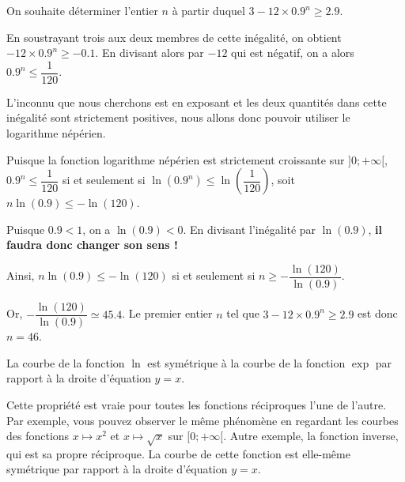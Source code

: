 \documentclass[11pt,fleqn, openany]{book} %
\begin{document}
\begin{example}On souhaite déterminer l'entier $n$ à partir duquel $3-12 \times 0.9^n \geqslant 2.9$.

En soustrayant trois aux deux membres de cette inégalité, on obtient $-12 \times 0.9^n \geqslant -0.1$. En divisant alors par $-12$ qui est négatif, on a alors $0.9^n \leqslant \dfrac{1}{120}$.

L'inconnu que nous cherchons est en exposant et les deux quantités dans cette inégalité sont strictement positives, nous allons donc pouvoir utiliser le logarithme népérien. 

Puisque la fonction logarithme népérien est strictement croissante sur $]0;+\infty[$,  $0.9^n \leqslant \dfrac{1}{120}$ si et seulement si $\ln(0.9^n) \leqslant \ln\left(\dfrac{1}{120}\right)$, soit $n\ln(0.9) \leqslant -\ln(120)$. 

Puisque $0.9<1$, on a $\ln(0.9) < 0$. En divisant l'inégalité par $\ln(0.9)$, \textbf{il faudra donc changer son sens !}

Ainsi, $n\ln(0.9) \leqslant -\ln(120)$ si et seulement si $n \geqslant -\dfrac{\ln(120)}{\ln(0.9)}$.

Or, $-\dfrac{\ln(120)}{\ln(0.9)} \simeq 45.4$. Le premier entier $n$ tel que $3-12 \times 0.9^n \geqslant 2.9$ est donc $n=46$.\end{example}

\begin{proposition}La courbe de la fonction $\ln$ est symétrique à la courbe de la fonction $\exp$ par rapport à la droite d'équation $y=x$.\end{proposition}

\begin{center}
\end{center}

Cette propriété est vraie pour toutes les fonctions réciproques l'une de l'autre. Par exemple, vous pouvez observer le même phénomène en regardant les courbes des fonctions $x\mapsto x^2$ et $x\mapsto \sqrt{x}$ sur $[0;+\infty[$. Autre exemple, la fonction inverse, qui est sa propre réciproque. La courbe de cette fonction est elle-même symétrique par rapport à la droite d'équation $y=x$.
\end{document}
